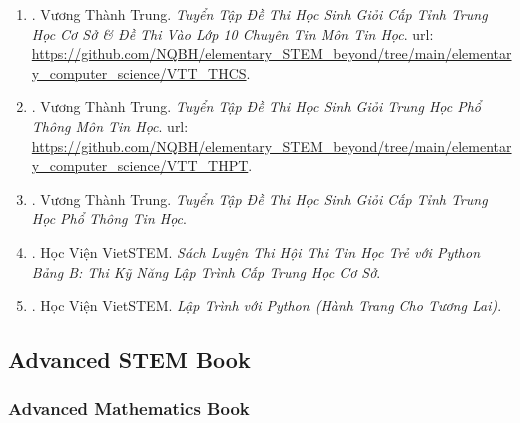 \documentclass{article}
\begin{document}
\begin{enumerate}
\begin{itemize}
	\end{itemize}
	\item \cite{Trung_THCS_Tin}. Vương Thành Trung. {\it Tuyển Tập Đề Thi Học Sinh Giỏi Cấp Tỉnh Trung Học Cơ Sở \& Đề Thi Vào Lớp 10 Chuyên Tin Môn Tin Học}. {\sc url}: \url{https://github.com/NQBH/elementary_STEM_beyond/tree/main/elementary_computer_science/VTT_THCS}.\hfill{\sf[reading]}
	\item \cite{Trung_THPT_Tin}. Vương Thành Trung. {\it Tuyển Tập Đề Thi Học Sinh Giỏi Trung Học Phổ Thông Môn Tin Học}. {\sc url}: \url{https://github.com/NQBH/elementary_STEM_beyond/tree/main/elementary_computer_science/VTT_THPT}.\hfill{\sf[reading]}
	\item \cite{Trung_HSG_THPT_Tin}. Vương Thành Trung. {\it Tuyển Tập Đề Thi Học Sinh Giỏi Cấp Tỉnh Trung Học Phổ Thông Tin Học}.\hfill{\sf[reading]}
	\item \cite{VietSTEM2021}. Học Viện VietSTEM. {\it Sách Luyện Thi Hội Thi Tin Học Trẻ  với Python Bảng B: Thi Kỹ Năng Lập Trình Cấp Trung Học Cơ Sở}.\hfill{\sf[reading]}
	\item \cite{VietSTEM2022}. Học Viện VietSTEM. {\it Lập Trình với Python (Hành Trang Cho Tương Lai)}.\hfill{\sf[done]}
\end{enumerate}


\subsection{Advanced STEM Book}

\subsubsection{Advanced Mathematics Book}
\end{document}
